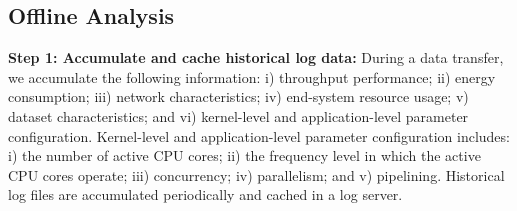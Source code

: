 \documentclass[conference]{IEEEtran}
\begin{document}
\subsection{Offline Analysis}

\textbf{Step 1: Accumulate and cache historical log data:}
During a data transfer, we accumulate the following information: i) throughput performance; ii) energy consumption; iii) network characteristics; iv) end-system resource usage; v) dataset characteristics; and vi) kernel-level and application-level parameter configuration.
Kernel-level and application-level parameter configuration includes: i) the number of active CPU cores; ii) the frequency level in which the active CPU cores operate; iii) concurrency; iv) parallelism; and v) pipelining. Historical log files are accumulated periodically and cached in a log server. 
\end{document}
